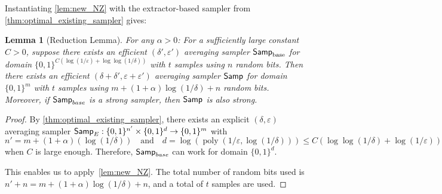 \documentclass[10pt,a4paper]{article}
\newtheorem{lemma}[theorem]{Lemma}
\DeclareMathOperator*{\poly}{poly}
\newcommand{\eps}{\varepsilon}
\newcommand{\1}{\mathbbm{1}}
\newcommand{\zo}{\{0, 1\}}
\newcommand{\Smp}{\textup{\textsf{Samp}}}
\begin{document}
Instantiating \cref{lem:new_NZ} with the extractor-based sampler from \cref{thm:optimal_existing_sampler} gives:

\begin{lemma}[Reduction Lemma]
\label{lem:one_step_reduction}
    For any $\alpha > 0$: For a sufficiently large constant $C > 0$,  suppose there exists an efficient $({\delta'}, \eps')$ averaging sampler $\Smp_{\text{base}}$ for domain $\zo^{C(\log (1 / \eps) + \log\log(1 / \delta))}$ with $t$ samples using $n$ random bits. Then there exists an efficient $(\delta + \delta', \eps + \eps')$ averaging sampler $\Smp$ for domain $\zo^m$ with $t$ samples using 
        $m + (1 + \alpha)\log (1 / \delta) + n$
        random bits. Moreover, if $\Smp_{base}$ is a strong sampler, then $\Smp$ is also strong.
\end{lemma}

\begin{proof}
    By \cref{thm:optimal_existing_sampler}, there exists an explicit $(\delta, \eps)$ averaging sampler $\Smp_{E}: \zo^{n'} \times \zo^d \to \zo^m$ with \[
        n' = {m + (1 + \alpha)(\log (1 / \delta))} \quad \text{and} \quad  d = \log (\poly(1 / \eps, \log (1 / \delta))) \le  C(\log\log (1 / \delta) + \log (1/\eps))\]
        when $C$ is large enough.
    Therefore, $\Smp_{base}$ can work for domain $\zo^d$. 


    This enables us to apply~\cref{lem:new_NZ}. The total number of random bits used is $n' + n = m + (1 + \alpha)\log (1 / \delta) + n$, and a total of $t$ samples are used.

    



\end{proof}
\end{document}
